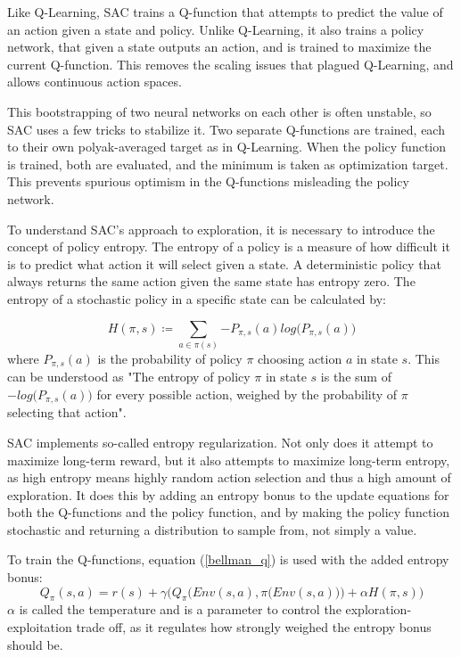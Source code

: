 Like Q-Learning, SAC trains a Q-function that attempts to predict the value of an action given a state and policy. Unlike Q-Learning, it also trains a policy network, that given a state outputs an action, and is trained to maximize the current Q-function. This removes the scaling issues that plagued Q-Learning, and allows continuous action spaces.

This bootstrapping of two neural networks on each other is often unstable, so SAC uses a few tricks to stabilize it. Two separate Q-functions are trained, each to their own polyak-averaged target as in Q-Learning. When the policy function is trained, both are evaluated, and the minimum is taken as optimization target. This prevents spurious optimism in the Q-functions misleading the policy network.

To understand SAC's approach to exploration, it is necessary to introduce the concept of policy entropy. The entropy of a policy is a measure of how difficult it is to predict what action it will select given a state. A deterministic policy that always returns the same action given the same state has entropy zero. The entropy of a stochastic policy in a specific state can be calculated by:

\begin{equation}
    H(\pi, s) \coloneqq \sum_{a \in \pi(s)}{-P_{\pi, s}(a) log\big(P_{\pi, s}(a)\big)}
\end{equation} where $P_{\pi, s}(a)$ is the probability of policy $\pi$ choosing action $a$ in state $s$. This can be understood as "The entropy of policy $\pi$ in state $s$ is the sum of $-log\big(P_{\pi, s}(a)\big)$ for every possible action, weighed by the probability of $\pi$ selecting that action".

SAC implements so-called entropy regularization. Not only does it attempt to maximize long-term reward, but it also attempts to maximize long-term entropy, as high entropy means highly random action selection and thus a high amount of exploration. It does this by adding an entropy bonus to the update equations for both the Q-functions and the policy function, and by making the policy function stochastic and returning a distribution to sample from, not simply a value.

To train the Q-functions, equation (\ref{bellman_q}) is used with the added entropy bonus:
\begin{equation}
    Q_{\pi}(s, a) = r(s) + \gamma \bigg(Q_{\pi}\Big(Env(s, a), \pi\big(Env(s, a)\big)\Big) + \alpha H(\pi, s)\bigg)
\end{equation}
$\alpha$ is called the temperature and is a parameter to control the exploration-exploitation trade off, as it regulates how strongly weighed the entropy bonus should be.

